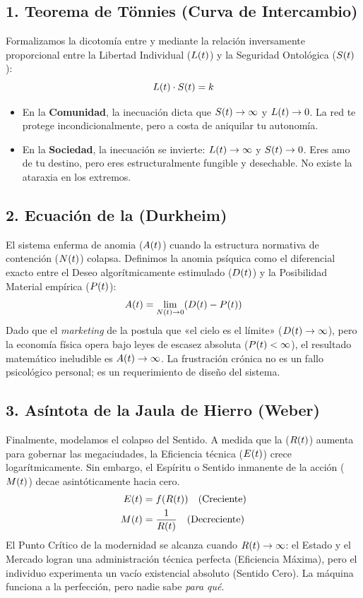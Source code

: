 \subsection{1. Teorema de Tönnies (Curva de Intercambio)}
Formalizamos la dicotomía entre \Gemeinschaft{} y \Gesellschaft{} mediante la relación inversamente proporcional entre la Libertad Individual ($L(t)$) y la Seguridad Ontológica ($S(t)$):
\begin{equation}
    L(t) \cdot S(t) = k
\end{equation}
\begin{itemize}
    \item En la \textbf{Comunidad}, la inecuación dicta que $S(t) \to \infty$ y $L(t) \to 0$. La red te protege incondicionalmente, pero a costa de aniquilar tu autonomía.
    \item En la \textbf{Sociedad}, la inecuación se invierte: $L(t) \to \infty$ y $S(t) \to 0$. Eres amo de tu destino, pero eres estructuralmente fungible y desechable. No existe la ataraxia en los extremos.
\end{itemize}

\subsection{2. Ecuación de la \Anomia{} (Durkheim)}
El sistema enferma de anomia ($A(t)$) cuando la estructura normativa de contención ($N(t)$) colapsa. Definimos la anomia psíquica como el diferencial exacto entre el Deseo algorítmicamente estimulado ($D(t)$) y la Posibilidad Material empírica ($P(t)$):
\begin{equation}
    A(t) = \lim_{N(t) \to 0} (D(t) - P(t))
\end{equation}
Dado que el \textit{marketing} de la \Gesellschaft{} postula que «el cielo es el límite» ($D(t) \to \infty$), pero la economía física opera bajo leyes de escasez absoluta ($P(t) < \infty$), el resultado matemático ineludible es $A(t) \to \infty$. La frustración crónica no es un fallo psicológico personal; es un requerimiento de diseño del sistema.

\subsection{3. Asíntota de la Jaula de Hierro (Weber)}
Finalmente, modelamos el colapso del Sentido. A medida que la \RacionalidadInstrumental{} ($R(t)$) aumenta para gobernar las megaciudades, la Eficiencia técnica ($E(t)$) crece logarítmicamente. Sin embargo, el Espíritu o Sentido inmanente de la acción ($M(t)$) decae asintóticamente hacia cero.
\begin{align}
    E(t) &= f(R(t)) \quad \text{(Creciente)} \\
    M(t) &= \frac{1}{R(t)} \quad \text{(Decreciente)}
\end{align}
El Punto Crítico de la modernidad se alcanza cuando $R(t) \to \infty$: el Estado y el Mercado logran una administración técnica perfecta (Eficiencia Máxima), pero el individuo experimenta un vacío existencial absoluto (Sentido Cero). La máquina funciona a la perfección, pero nadie sabe \textit{para qué}.

